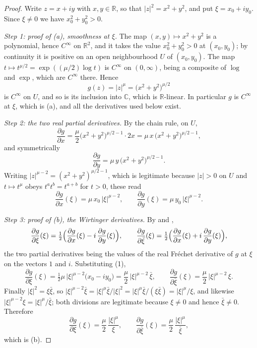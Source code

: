 \begin{proof}
Write $z=x+iy$ with $x,y\in\mathbb{R}$, so that $|z|^2=x^2+y^2$, and put
$\xi=x_0+iy_0$.  Since $\xi\neq0$ we have $x_0^2+y_0^2>0$.

\emph{Step 1: proof of (a), smoothness at $\xi$.}  The map $(x,y)\mapsto x^2+y^2$ is a
polynomial, hence $C^\infty$ on $\mathbb{R}^2$, and it takes the value
$x_0^2+y_0^2>0$ at $(x_0,y_0)$; by continuity it is positive on an open
neighbourhood $U$ of $(x_0,y_0)$.  The map $t\mapsto t^{\mu/2}=\exp((\mu/2)\log t)$
is $C^\infty$ on $(0,\infty)$, being a composite of $\log$ and $\exp$, which are
$C^\infty$ there.  Hence
\[
  g(z)=|z|^{\mu}=\bigl(x^2+y^2\bigr)^{\mu/2}
\]
is $C^\infty$ on $U$, and so is its inclusion into $\mathbb{C}$, which is
$\mathbb{R}$-linear.  In particular $g$ is $C^\infty$ at $\xi$, which is (a), and all the
derivatives used below exist.

\emph{Step 2: the two real partial derivatives.}  By the chain rule, on $U$,
\[
  \frac{\partial g}{\partial x}
  =\frac{\mu}{2}\bigl(x^2+y^2\bigr)^{\mu/2-1}\cdot2x
  =\mu\,x\,\bigl(x^2+y^2\bigr)^{\mu/2-1},
\]
and symmetrically
\[
  \frac{\partial g}{\partial y}=\mu\,y\,\bigl(x^2+y^2\bigr)^{\mu/2-1}.
\]
Writing $|z|^{\mu-2}=(x^2+y^2)^{\mu/2-1}$, which is legitimate because
$|z|>0$ on $U$ and $t\mapsto t^{\mu}$ obeys $t^{a}t^{b}=t^{a+b}$ for $t>0$,
these read
\begin{equation}\tag{1}
  \frac{\partial g}{\partial x}(\xi)=\mu\,x_0\,|\xi|^{\mu-2},\qquad
  \frac{\partial g}{\partial y}(\xi)=\mu\,y_0\,|\xi|^{\mu-2}.
\end{equation}

\emph{Step 3: proof of (b), the Wirtinger derivatives.}  By  and ,
\[
  \frac{\partial g}{\partial\xi}(\xi)
    =\tfrac12\Bigl(\frac{\partial g}{\partial x}(\xi)
      -i\,\frac{\partial g}{\partial y}(\xi)\Bigr),\qquad
  \frac{\partial g}{\partial\bar\xi}(\xi)
    =\tfrac12\Bigl(\frac{\partial g}{\partial x}(\xi)
      +i\,\frac{\partial g}{\partial y}(\xi)\Bigr),
\]
the two partial derivatives being the values of the real Fréchet derivative of
$g$ at $\xi$ on the vectors $1$ and $i$.  Substituting (1),
\[
  \frac{\partial g}{\partial\xi}(\xi)
  =\tfrac12\mu\,|\xi|^{\mu-2}\bigl(x_0-iy_0\bigr)
  =\frac{\mu}{2}\,|\xi|^{\mu-2}\,\bar\xi,
  \qquad
  \frac{\partial g}{\partial\bar\xi}(\xi)
  =\frac{\mu}{2}\,|\xi|^{\mu-2}\,\xi .
\]
Finally $|\xi|^2=\xi\bar\xi$, so $|\xi|^{\mu-2}\bar\xi
=|\xi|^{\mu}\bar\xi/|\xi|^{2}=|\xi|^{\mu}\bar\xi/(\xi\bar\xi)=|\xi|^{\mu}/\xi$,
and likewise $|\xi|^{\mu-2}\xi=|\xi|^{\mu}/\bar\xi$; both divisions are
legitimate because $\xi\neq0$ and hence $\bar\xi\neq0$.  Therefore
\[
  \frac{\partial g}{\partial\xi}(\xi)=\frac{\mu}{2}\,\frac{|\xi|^{\mu}}{\xi},
  \qquad
  \frac{\partial g}{\partial\bar\xi}(\xi)
    =\frac{\mu}{2}\,\frac{|\xi|^{\mu}}{\bar\xi},
\]
which is (b).
\end{proof}
